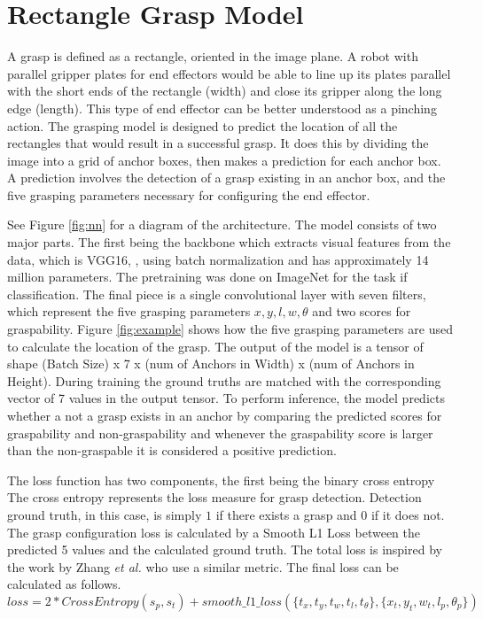 \documentclass{article}
\begin{document}
\newpage
\section{Rectangle Grasp Model}
A grasp is defined as a rectangle, oriented in the image plane. A robot with
parallel gripper plates for end effectors would be able to line up its plates
parallel with the short ends of the rectangle (width) and close its gripper along the
long edge (length). This type of end effector can be better understood as a pinching
action.
The grasping model is designed to predict the location of all
the rectangles that would result in a successful grasp. It does this by dividing the
image into a grid of anchor boxes, then makes a prediction for each anchor box. A
prediction involves the detection of a grasp existing in an anchor box, and the five
grasping parameters necessary for configuring the end effector.

See Figure \ref{fig:nn} for a diagram of the architecture.
The model consists of two major parts. The first being the backbone which extracts
visual features from the data, which is VGG16, \cite{simonyan14},
using batch normalization and has approximately 14 million parameters. The
pretraining was done on ImageNet for the task if classification.
The final
piece is a single convolutional layer with seven filters, which represent the
five grasping parameters $x, y, l, w, \theta$ and two scores for graspability.
Figure \ref{fig:example} shows how the five grasping parameters are used to
calculate the location of the grasp. The output of the model is a tensor of
shape (Batch Size) x 7 x (num of Anchors in Width) x (num of Anchors in Height).
During training the ground truths are matched with the corresponding vector of
7 values in the output tensor. To perform inference, the model predicts
whether a not a grasp exists in an anchor by comparing the predicted scores
for graspability and non-graspability
and whenever the graspability score is larger than the non-graspable it
is considered a positive prediction.

The loss function has two components, the first being the binary cross entropy
The cross entropy
represents the loss measure for grasp detection. Detection ground truth, in
this case, is simply $1$ if there exists a grasp and $0$ if it does not.
The grasp configuration loss is calculated by a Smooth L1 Loss between
the predicted 5 values and the calculated ground truth. The total loss is inspired
by the work by Zhang \textit{et al.} \cite{zhang18} who use a similar metric.
The final loss can be calculated as follows.
\begin{equation*}
loss = 2*CrossEntropy(s_p, s_t) + smooth\_l1\_loss(\{t_x, t_y, t_w, t_l, t_\theta\}, \{x_t, y_t, w_t, l_p, \theta_p\})
\end{equation*}
\end{document}
